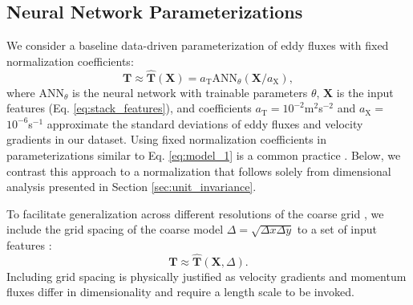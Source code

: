 \documentclass[draft]{agujournal2019}
\begin{document}
%

\subsection{Neural Network Parameterizations} \label{sec: eddy_param}

We consider a baseline data-driven parameterization of eddy fluxes with fixed normalization coefficients:
\begin{equation}
    \mathbf{T} \approx \widehat{\mathbf{T}}(\mathbf{X}) = a_{\mathrm{T}} \mathrm{ANN}_{\theta}(\mathbf{X} / a_{\mathrm{X}}), \label{eq:model_1}
\end{equation}
where $\mathrm{ANN}_{\theta}$ is the neural network with trainable parameters $\theta$,  $\mathbf{X}$ is the input features (Eq. \eqref{eq:stack_features}), and coefficients $a_{\mathrm{T}}=$$10^{-2}$m$^2$s$^{-2}$ and $a_{\mathrm{X}}=$ $10^{-6}$s$^{-1}$ approximate the standard deviations of eddy fluxes and velocity gradients in our dataset.
Using fixed normalization coefficients in parameterizations similar to Eq. \eqref{eq:model_1} is a common practice \cite{srinivasan2024turbulence}. Below, we contrast this approach to a normalization that follows solely from dimensional analysis presented in Section \ref{sec:unit_invariance}.

To facilitate generalization across different resolutions of the coarse grid \cite<scale-aware or grid-aware parameterization,>{bachman2017scale}, we include the grid spacing of the coarse model $\Delta = \sqrt{\Delta x \Delta y}$ to a set of input features \cite{lund1993parameterization, li2025transformer}:
\begin{equation}
    \mathbf{T} \approx \widehat{\mathbf{T}}(\mathbf{X}, \Delta). \label{eq:model_2}
\end{equation}
Including grid spacing is physically justified as velocity gradients and momentum fluxes differ in dimensionality and require a length scale to be invoked.
\end{document}

